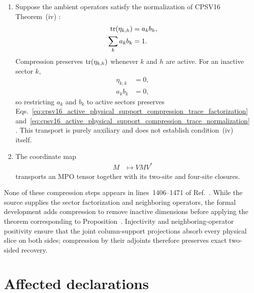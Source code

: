 \documentclass{article}
\begin{document}
\begin{enumerate}
    \item Suppose the ambient operators satisfy the normalization of CPSV16
    Theorem~(iv) \cite{Cirac2017MPDO_AnnPhys}:
    \begin{align}
        \operatorname{tr}(\eta_{k,h})
            &=
        a_kb_h,
        \label{eq:cpsv16_active_physical_support_compression_trace_factorization}\\
        \sum_k a_kb_k
            &=
        1.
        \label{eq:cpsv16_active_physical_support_compression_trace_normalization}
    \end{align}
    Compression preserves $\operatorname{tr}(\eta_{k,h})$ whenever $k$ and $h$ are active.
    For an inactive sector $k$,
    \begin{align}
        \eta_{k,k}
            &= 0,
        \label{eq:cpsv16_active_physical_support_compression_inactive_neighbor}\\
        a_kb_k
            &= 0,
        \label{eq:cpsv16_active_physical_support_compression_inactive_weight}
    \end{align}
    so restricting $a_k$ and $b_k$ to active sectors preserves
    Eqs.~\eqref{eq:cpsv16_active_physical_support_compression_trace_factorization}
    and~\eqref{eq:cpsv16_active_physical_support_compression_trace_normalization}.
    This transport is purely auxiliary and does not establish condition~(iv)
    itself.

    \item The coordinate map
    \begin{align}
        M
            &\longmapsto
        VMV^*
        \label{eq:cpsv16_active_physical_support_compression_coordinate_transport}
    \end{align}
    transports an MPO tensor together with its two-site and four-site
    closures.
\end{enumerate}

None of these compression steps appears in lines~1406--1471 of
Ref.~\cite{Cirac2016MPDO_arXiv}. While the source supplies the sector
factorization and neighboring operators, the formal development adds
compression to remove inactive dimensions before applying the theorem
corresponding to Proposition~. Injectivity and
neighboring-operator positivity ensure that the joint column-support
projections absorb every physical slice on both sides; compression by their
adjoints therefore preserves exact two-sided recovery.

\section{Affected declarations}
\end{document}
